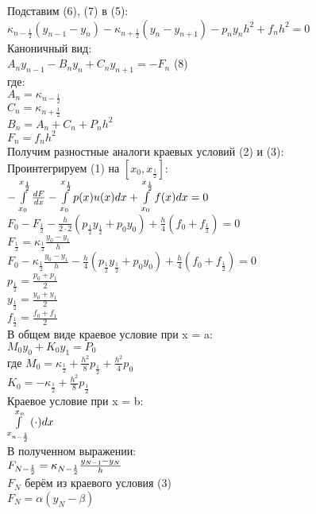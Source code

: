 Подставим (6), (7) в (5):\\
$\kappa_{n-\frac{1}{2}}(y_{n-1} - y_n) - \kappa_{n+\frac{1}{2}} (y_n - y_{n+1}) - p_n y_n h^2 + f_n h^2 = 0$\\

Каноничный вид:\\
$A_n y_{n-1} - B_n y_n + C_n y_{n+1}  = -F_n$ (8)\\
где:\\
$A_n = \kappa_{n-\frac{1}{2}}$\\
$C_n = \kappa_{n+\frac{1}{2}}$\\
$B_n = A_n + C_n + P_n h^2$\\
$F_n = f_n h^2$\\

Получим разностные аналоги краевых условий (2) и (3):\\
Проинтегрируем (1) на $[x_0, x_{\frac{1}{2}}]:$\\
$-\int\limits_{x_0}^{x_{\frac{1}{2}}} \frac{dF}{dx} - \int\limits_{x_0}^{x_{\frac{1}{2}}} p(x) u(x) dx + \int\limits_{x_0}^{x_{\frac{1}{2}}} f(x) dx = 0$\\
$F_0 - F_{\frac{1}{2}} - \frac{h}{2\cdot2} (p_{\frac{1}{2}} y_{\frac{1}{2}} + p_0 y_0) + \frac{h}{4} (f_0 + f_{\frac{1}{2}}) = 0$\\
$F_{\frac{1}{2}} = \kappa_{\frac{1}{2}} \frac{y_0 - y_1}{h}$\\
$F_0 - \kappa_{\frac{1}{2}} \frac{y_0 - y_1}{h} - \frac{h}{4}(p_{\frac{1}{2}} y_{\frac{1}{2}} + p_0 y_0) + \frac{h}{4}(f_0 + f_{\frac{1}{2}}) = 0$\\
$p_{\frac{1}{2}} = \frac{p_0 + p_1}{2}$\\
$y_{\frac{1}{2}} = \frac{y_0 + y_1}{2}$\\
$f_{\frac{1}{2}} = \frac{f_0 + f_1}{2}$\\

В общем виде краевое условие при x = a:\\
$M_0 y_0 + K_0 y_1 = P_0$\\
где $M_0 = \kappa_{\frac{1}{2}} + \frac{h^2}{8} p_{\frac{1}{2}} + \frac{h^2}{4} p_0$\\
$K_0 = -\kappa_\frac{1}{2} + \frac{h^2}{8} p_{\frac{1}{2}}$\\
Краевое условие при x = b:\\
$\int\limits_{x_{n - \frac{1}{2}}}^{x_n} (\cdot) dx$\\
 
В полученном выражении:\\
$F_{N - \frac{1}{2}} = \kappa_{N - \frac{1}{2}} \frac{y_{N-1} - y_N}{h}$\\
$F_N$ берём из краевого условия (3)\\
$F_N = \alpha(y_N - \beta)$\\

